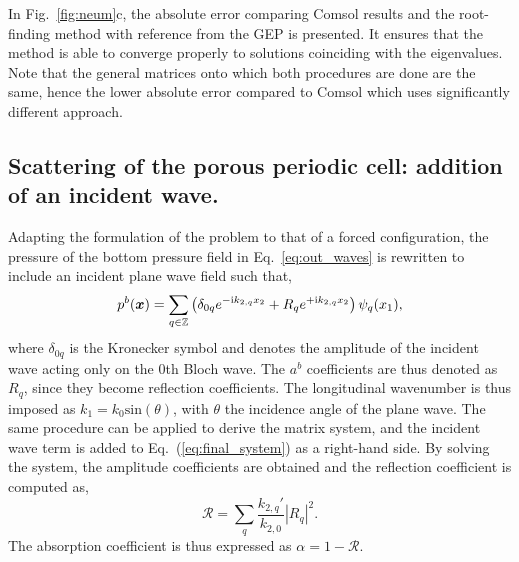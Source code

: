 In Fig.~\ref{fig:neum}c, the absolute error comparing Comsol results and the root-finding method with reference from the GEP is presented. It ensures that the method is able to converge properly to solutions coinciding with the eigenvalues. Note that the general matrices onto which both procedures are done are the same, hence the lower absolute error compared to Comsol which uses significantly different approach.


\subsection{Scattering of the porous periodic cell: addition of an incident wave.}
\label{app:direct_pb}
Adapting the formulation of the problem to that of a forced configuration, the pressure of the bottom pressure field in Eq.~\ref{eq:out_waves} is rewritten to include an incident plane wave field such that, 
\begin{equation}
    p^b(\boldsymbol x) = \sum_{q \in \mathbb Z} \left(\delta_{0q} e^{-\mathrm i k_{2, q} x_2} + R_q  e^{+ \mathrm i k_{2, q} x_2}\right) \psi_q(x_1),
\end{equation}
where $\delta_{0q}$ is the Kronecker symbol and denotes the amplitude of the incident wave acting only on the 0th Bloch wave. The $a^b$ coefficients are thus denoted as $R_q$, since they become reflection coefficients. The longitudinal wavenumber is thus imposed as $k_1=k_0\mathrm{sin}(\theta)$, with $\theta$ the incidence angle of the plane wave. The same procedure can be applied to derive the matrix system, and the incident wave term is added to Eq.~(\ref{eq:final_system}) as a right-hand side. By solving the system, the amplitude coefficients are obtained and the reflection coefficient is computed as, 
\begin{equation}
    \mathcal R = \sum_q \frac{k_{2,q}'}{k_{2, 0}} |R_q|^2.
\end{equation}
The absorption coefficient is thus expressed as $\alpha = 1 - \mathcal R$.

